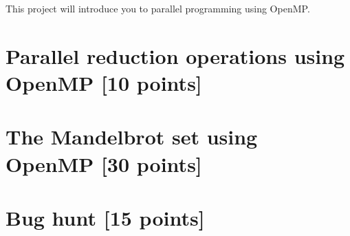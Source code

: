 \documentclass[unicode,11pt,a4paper,oneside,numbers=endperiod,openany]{scrartcl}
\begin{document}
\setassignment
{}

\newline

\assignmentpolicy
This project will introduce you to parallel programming using OpenMP.


\section{Parallel reduction operations using OpenMP [10 points]}



\section{The Mandelbrot set using OpenMP [30 points]}



\section{Bug hunt [15 points]}


\end{document}
